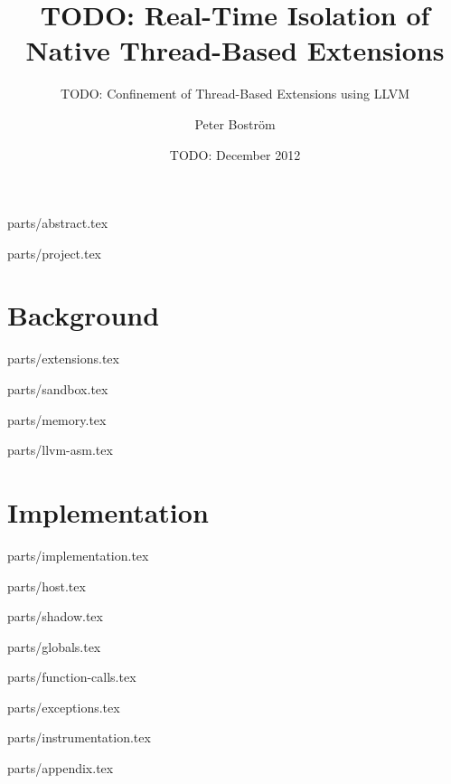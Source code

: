 \documentclass[a4paper,11pt]{xjobb/kth-mag}
\title {TODO: Real-Time Isolation of Native Thread-Based Extensions}
\subtitle {TODO: Confinement of Thread-Based Extensions using LLVM}
\author {Peter Boström}
\date {TODO: December 2012}
\begin{document}
\frontmatter
\pagestyle {empty}
\removepagenumbers
\maketitle
{}

 {parts/abstract.tex}

\clearpage
\tableofcontents*
\mainmatter
\pagestyle {newchap}

 {parts/project.tex}


\part {Background}

 {parts/extensions.tex}

 {parts/sandbox.tex}

 {parts/memory.tex}

 {parts/llvm-asm.tex}


\part {Implementation}

 {parts/implementation.tex}

 {parts/host.tex}

 {parts/shadow.tex}

 {parts/globals.tex}

 {parts/function-calls.tex}

 {parts/exceptions.tex}

 {parts/instrumentation.tex}


\appendix
\addappheadtotoc

 {parts/appendix.tex}
\end{document}
